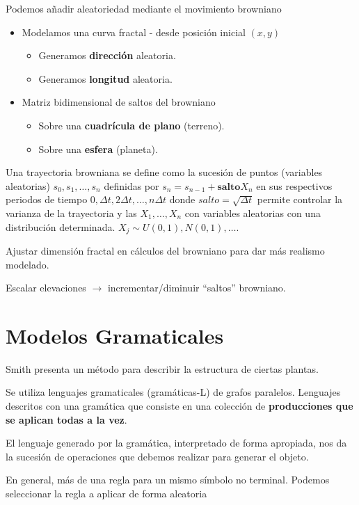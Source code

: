Podemos añadir aleatoriedad mediante el movimiento browniano
\begin{itemize}
	\item Modelamos una curva fractal - desde posición inicial $(x, y)$
	      \begin{itemize}
		      \item Generamos \textbf{dirección} aleatoria.
		      \item Generamos \textbf{longitud} aleatoria.
	      \end{itemize}
	\item Matriz bidimensional de saltos del browniano
	      \begin{itemize}
		      \item Sobre una \textbf{cuadrícula de plano} (terreno).
		      \item Sobre una \textbf{esfera} (planeta).
	      \end{itemize}
\end{itemize}

Una trayectoria browniana se define como la sucesión de puntos (variables aleatorias) $s_0, s_1, \ldots, s_n$ definidas por $s_n = s_{n-1} + \textbf{salto} X_n$ en sus respectivos periodos de tiempo $0, \Delta t, 2\Delta t, \ldots, n\Delta t$ donde $\textit{salto}=\sqrt{\Delta t}$ permite controlar la varianza de la trayectoria y las $X_1, \ldots, X_n$ con variables aleatorias con una distribución determinada. $X_j \sim U(0,1), N(0,1), \ldots$.

Ajustar dimensión fractal en cálculos del browniano para dar más realismo modelado.

Escalar elevaciones $\rightarrow$ incrementar/diminuir \enquote{saltos} browniano.

\section{Modelos Gramaticales}
Smith presenta un método para describir la estructura de ciertas plantas.

Se utiliza lenguajes gramaticales (gramáticas-L) de grafos paralelos. Lenguajes descritos con una gramática que consiste en una colección de \textbf{producciones que se aplican todas a la vez}.

El lenguaje generado por la gramática, interpretado de forma apropiada, nos da la sucesión de operaciones que debemos realizar para generar el objeto.

En general, más de una regla para un mismo símbolo no terminal. Podemos seleccionar la regla a aplicar de forma aleatoria

